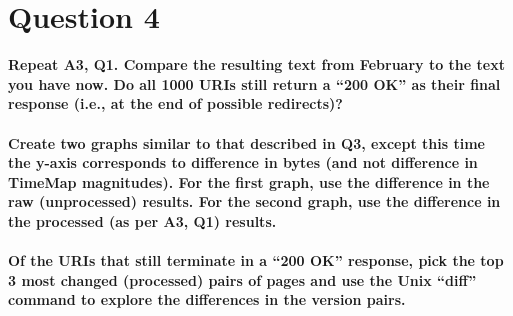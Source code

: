 \chapter{Question 4}
\label{available-representation}

\textbf{Repeat A3, Q1.  Compare the resulting text from February to the text you have now.  Do all 1000 URIs still return a ``200 OK'' as their final response (i.e., at the end of possible redirects)?\\\\
Create two graphs similar to that described in Q3, except this time the y-axis corresponds to difference in bytes (and not difference in TimeMap magnitudes).  For the first graph, use the difference in the raw (unprocessed) results.  For the second graph, use the  difference in the processed (as per A3, Q1) results.\\\\
Of the URIs that still terminate in a ``200 OK'' response, pick the top 3 most changed (processed) pairs of pages and use the Unix ``diff'' command to explore the differences in the version pairs.}\\\\

